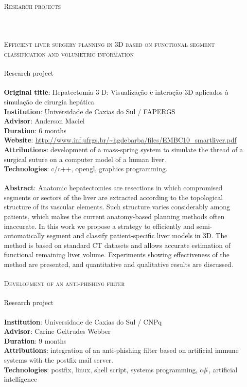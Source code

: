 \noindent
\textsc{\Huge Research projects} \\\\\\\\
\noindent
\textsc
    {\Large Efficient liver surgery planning in 3D based on functional segment
    classification and volumetric information} \\\\
Research project \\\\
\textbf{Original title}:
    Hepatectomia 3-D: Visualização e interação 3D aplicados à simulação
    de cirurgia hepática \\
\textbf{Institution}: Universidade de Caxias do Sul / FAPERGS \\
\textbf{Advisor}: Anderson Maciel \\
\textbf{Duration}: 6 months \\
\textbf{Website}:
    \url{http://www.inf.ufrgs.br/~hgdebarba/files/EMBC10_smartliver.pdf} \\
\textbf{Attributions}:
    development of a mass-spring system to simulate the thread of a surgical
    suture on a computer model of a human liver.  \\
\textbf{Technologies}: c/c++, opengl, graphics programming. \\\\
\textbf{Abstract}:
    Anatomic hepatectomies are resections in which compromised segments or
    sectors of the liver are extracted according to the topological structure
    of its vascular elements. Such structure varies considerably among
    patients, which makes the current anatomy-based planning methods often
    inaccurate. In this work we propose a strategy to efficiently and
    semi-automatically segment and classify patient-specific liver models in
    3D. The method is based on standard CT datasets and allows accurate
    estimation of functional remaining liver volume. Experiments showing
    effectiveness of the method are presented, and quantitative and qualitative
    results are discussed. \\\\

\noindent
\textsc{\Large Development of an anti-phishing filter} \\\\
Research project \\\\
\textbf{Institution}: Universidade de Caxias do Sul / CNPq \\
\textbf{Advisor}: Carine Geltrudes Webber \\
\textbf{Duration}: 9 months \\
\textbf{Attributions}:
    integration of an anti-phishing filter based on artificial immune systems
    with the postfix mail server. \\
\textbf{Technologies}:
    postfix, linux, shell script, systems programming, c\#, artificial
    intelligence
